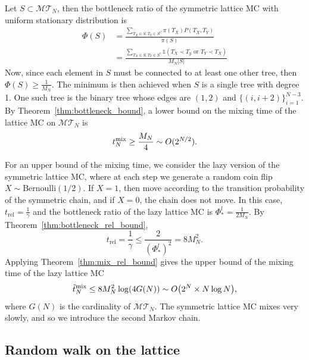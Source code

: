 \documentclass{article}
\begin{document}
Let $S \subset \mathcal{MT}_N$, then the bottleneck ratio of the symmetric lattice MC with uniform stationary distribution is  
\begin{align*}
    \Phi(S) &= \frac{\sum_{T_X\in S, T_Y \in S^C} \pi(T_X) P(T_X,T_Y) }{\pi(S)} \\
    &= \frac{\sum_{T_{X}\in S, T_{Y} \in S^c} \mathds{1} (T_{X} \prec T_{y} \text{ or } T_{Y} \prec T_{X}) }{M_N |S|} 
\end{align*}
Now, since each element in $S$ must be connected to at least one other tree, then $\Phi(S) \geq \frac{1}{M_N}$. The minimum is then achieved when $S$ is a single tree with degree 1. One such tree is the binary tree whose edges are $(1,2)$ and $\{(i, i+2)\}_{i=1}^{N-3}$. By Theorem~\ref{thm:bottleneck_bound}, a lower bound on the mixing time of the lattice MC on $\mathcal{MT}_N$ is 
\begin{equation} \label{eq:mixing_lb}
    t^{\textup{mix}}_N \geq  \frac{M_N}{4} \sim O(2^{N/2}).
\end{equation} 

For an upper bound of the mixing time, we consider the lazy version of the symmetric lattice MC, where at each step we generate a random coin flip $X \sim \text{Bernoulli}(1/2)$. If $X=1$, then move according to the transition probability of the symmetric chain, and if $X=0$, the chain does not move. In this case, $t_{\text{rel}} = \frac{1}{\gamma}$ and the bottleneck ratio of the lazy lattice MC is $\Phi_*^l = \frac{1}{2M_N}$. By Theorem~\ref{thm:bottleneck_rel_bound}, \[ t_{\text{rel}} = \frac{1}{\gamma} \leq \frac{2}{(\Phi_*^l)^2} = 8 M_N^2 .\] Applying Theorem~\ref{thm:mix_rel_bound} gives the upper bound of the mixing time of the lazy lattice MC 
\begin{equation} \label{eq:mixing_ub}
    \tilde{t}^{\textup{mix}}_N \leq 8 M_N^2  \log(4 G(N)) \sim O\big (2^N \times N \log N\big ), 
\end{equation}
where $G(N)$ is the cardinality of $\mathcal{MT}_N$. The symmetric lattice MC mixes very slowly, and so we introduce the second Markov chain. 

\subsection{Random walk on the lattice}
\end{document}
